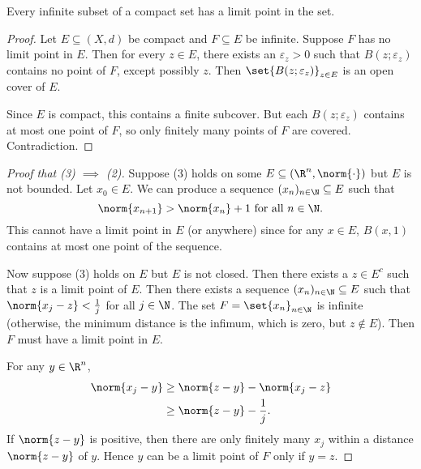 \begin{theorem*}
    Every infinite subset of a compact set has a limit point in the set.
\end{theorem*}
\begin{proof}
    Let $E \subseteq (X, d)$ be compact and $F \subseteq E$ be infinite.
    Suppose $F$ has no limit point in $E$.
    Then for every $z \in E$, there exists an $\varepsilon_z > 0$ such that
    $B(z; \varepsilon_z)$ contains no point of $F$, except possibly $z$.
    Then $\set{B(z; \varepsilon_z)}_{z \in E}$ is an open cover of $E$.

    Since $E$ is compact, this contains a finite subcover.
    But each $B(z; \varepsilon_z)$ contains at most one point of $F$,
    so only finitely many points of $F$ are covered.
    Contradiction.
\end{proof}

\begin{proof}[Proof that (3) $\implies$ (2)]
    Suppose (3) holds on some $E \subseteq (\R^n, \norm{\cdot})$ but
    $E$ is not bounded.
    Let $x_0 \in E$.
    We can produce a sequence $(x_n)_{n \in \N} \subseteq E$ such that \[
        \norm{x_{n+1}} > \norm{x_n} + 1 \text{ for all } n \in \N.
    \] This cannot have a limit point in $E$ (or anywhere) since for any
    $x \in E$, $B(x, 1)$ contains at most one point of the sequence.

    Now suppose (3) holds on $E$ but $E$ is not closed.
    Then there exists a $z \in E^c$ such that $z$ is a limit point of $E$.
    Then there exists a sequence $(x_n)_{n \in \N} \subseteq E$ such that
    $\norm{x_j - z} < \frac1j$ for all $j \in \N$.
    The set $F = \set{x_n}_{n \in \N}$ is infinite (otherwise, the minimum
    distance is the infimum, which is zero, but $z \notin E$).
    Then $F$ must have a limit point in $E$.

    For any $y \in \R^n$, \begin{align*}
        \norm{x_j - y} &\ge \norm{z - y} - \norm{x_j - z} \\
                 &\ge \norm{z - y} - \frac1j.
    \end{align*} If $\norm{z - y}$ is positive, then there are only finitely
    many $x_j$ within a distance $\norm{z - y}$ of $y$.
    Hence $y$ can be a limit point of $F$ only if $y = z$.
\end{proof}

